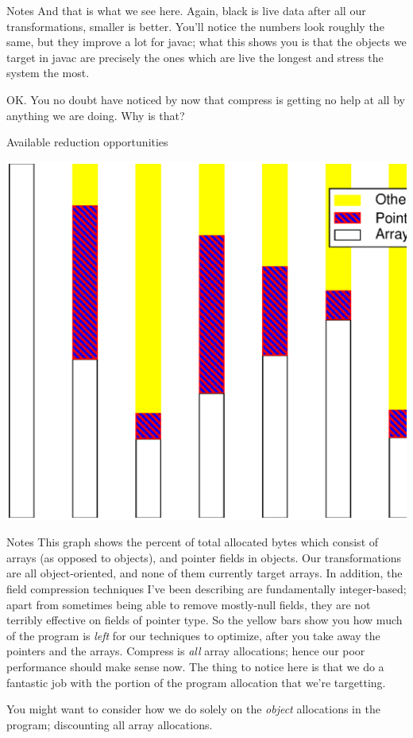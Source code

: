 \documentclass[%
pdf,
colorBG,
slideColor,
nototal,
oqe
]{prosper}
\newenvironment{talknotes}{\begin{slide}{Notes}\tiny}{\end{slide}}
\begin{document}
\begin{talknotes}
And that is what we see here.  Again, black is live data after all our
transformations, smaller is better.
You'll notice the numbers look roughly
the same, but they improve a lot for javac; what this shows you is
that the objects we target in javac are precisely the ones which are
live the longest and stress the system the most.

OK.  You no doubt have noticed by now that compress is getting no help
at all by anything we are doing.  Why is that?
\end{talknotes}

\begin{slide}{Available reduction opportunities}
\begin{center}
\includegraphics[scale=0.45]{Figures/spec-space-3.eps}
\end{center}
\end{slide}

\begin{talknotes}
This graph shows the percent of total allocated bytes which consist of
arrays (as opposed to objects), and pointer fields in objects.
Our transformations are all object-oriented, and none of them
currently target arrays.  In addition, the field compression
techniques I've been describing are fundamentally integer-based;
apart from sometimes being able to remove mostly-null fields,
they are not terribly effective on fields of pointer type.  So the
yellow bars show you how much of the program is \emph{left} for our
techniques to optimize, after you take away the pointers and the arrays.
Compress is \emph{all} array allocations; hence our poor performance
should make sense now.  The thing to notice here is that we do a
fantastic job with the portion of the program allocation that we're
targetting.

You might want to consider how we do
solely on the \emph{object} allocations in the program; discounting
all array allocations.
\end{talknotes}
\end{document}
